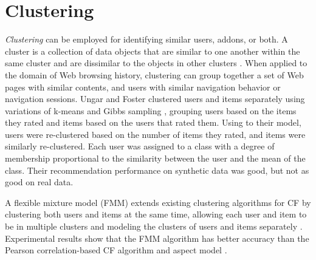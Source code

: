\documentclass[11pt,oneside]{book}
\let\Oldsection\section
\renewcommand{\section}{\FloatBarrier\Oldsection}
\begin{document}
\section{Clustering}

\emph{Clustering} can be employed for identifying similar users, addons, or both. A cluster is a collection of data objects that are similar to
one another within the same cluster and are dissimilar to the objects
in other clusters \citep{han2006data}. When applied to the domain of Web browsing
history, clustering can group together a set of Web pages with similar
contents, and users with similar navigation behavior or navigation
sessions. Ungar and Foster \citep{ungar1998clustering} clustered users and items separately
using variations of k-means and Gibbs sampling \citep{geman1984stochastic}, grouping users
based on the items they rated and items based on the users that rated
them. Using to their model, users were re-clustered based on the
number of items they rated, and items were similarly
re-clustered. Each user was assigned to a class with a degree of
membership proportional to the similarity between the user and the
mean of the class. Their recommendation performance on synthetic data
was good, but not as good on real data. 

A flexible mixture model (FMM)
extends existing clustering algorithms for CF by clustering both users
and items at the same time, allowing each user and item to be in
multiple clusters and modeling the clusters of users and items
separately \citep{si03}. Experimental results show that the FMM algorithm has
better accuracy than the Pearson correlation-based CF algorithm and
aspect model \citep{hofmann2004latent}. 
\end{document}
